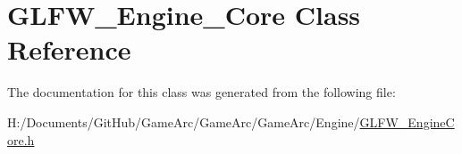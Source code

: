 \hypertarget{class_g_l_f_w___engine___core}{\section{G\+L\+F\+W\+\_\+\+Engine\+\_\+\+Core Class Reference}
\label{class_g_l_f_w___engine___core}
}


The documentation for this class was generated from the following file\+:\begin{DoxyCompactItemize}
\item 
H\+:/\+Documents/\+Git\+Hub/\+Game\+Arc/\+Game\+Arc/\+Game\+Arc/\+Engine/\hyperlink{_g_l_f_w___engine_core_8h}{G\+L\+F\+W\+\_\+\+Engine\+Core.\+h}\end{DoxyCompactItemize}

